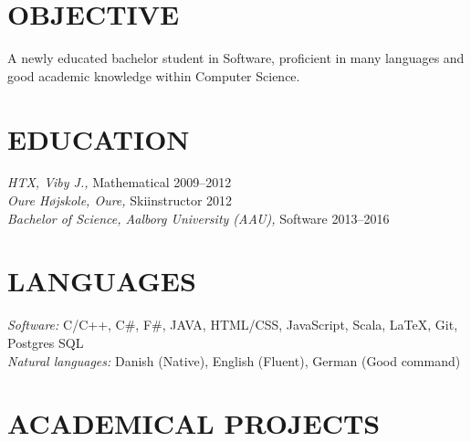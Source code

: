 \documentclass[margin, 10pt]{res} %
\begin{document}
\begin{resume}

 
\section{OBJECTIVE}  

A newly educated bachelor student in Software, proficient in many languages and good academic knowledge within Computer Science.


\section{EDUCATION}

{\sl HTX, Viby J.,} Mathematical \hfill 2009--2012 \\
{\sl Oure Højskole, Oure,} Skiinstructor \hfill 2012 \\
{\sl Bachelor of Science, Aalborg University (AAU),} Software \hfill 2013--2016
 
\section{LANGUAGES} 

{\sl Software:} 
C/C++, C\#, F\#, JAVA, HTML/CSS, JavaScript, Scala, LaTeX, Git, Postgres SQL \\
{\sl Natural languages:}
{Danish (Native), English (Fluent), German (Good command)}
 
\section{ACADEMICAL PROJECTS}


\end{resume}
\end{document}
